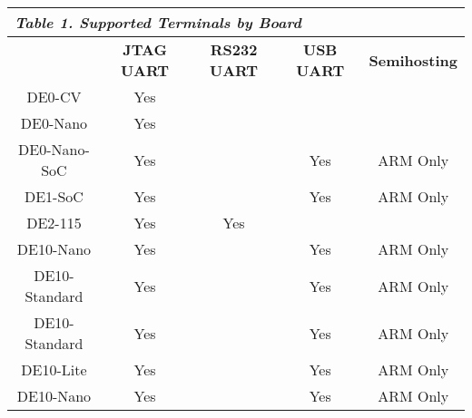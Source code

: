 \begin{table}[h]

    \centering
    \begin{tabular}{|c|c|c|c|c|}
        \hline
        \multicolumn{5}{|l|}{\textit{\textbf{Table 1. Supported Terminals by Board}}}
        \\\hline
            \textbf{}
            & \textbf{JTAG UART}
            & \textbf{RS232 UART}
            & \textbf{USB UART}
            & \textbf{Semihosting}
        \\\hline
            DE0-CV
            & Yes
            & 
            & 
            & 
        \\\hline
            DE0-Nano
            & Yes
            & 
            & 
            & 
        \\\hline
						DE0-Nano-SoC
            & Yes
            & 
            & Yes
            & ARM Only
        \\\hline
            DE1-SoC
            & Yes
            & 
            & Yes
            & ARM Only
        \\\hline
            DE2-115
            & Yes
            & Yes
            & 
            & 
        \\\hline
            DE10-Nano
            & Yes
            & 
            & Yes
            & ARM Only
        \\\hline
            DE10-Standard
            & Yes
            & 
            & Yes
            & ARM Only
        \\\hline
            DE10-Standard
            & Yes
            & 
            & Yes
            & ARM Only
        \\\hline
            DE10-Lite
            & Yes
            & 
            & Yes
            & ARM Only
        \\\hline
            DE10-Nano
            & Yes
            & 
            & Yes
            & ARM Only
        \\\hline
    \end{tabular}
    \label{tab:regfiles}
\end{table}